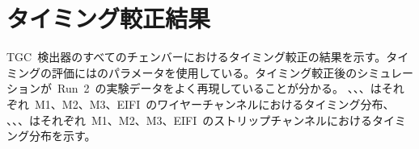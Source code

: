 \renewcommand{\prechaptername}{付録}
\renewcommand{\postchaptername}{}
\renewcommand{\thechapter}{\Alph{chapter}}
\setcounter{chapter}{0}

\chapter{タイミング較正結果}
\thispagestyle{empty}
\label{app:app1}
TGC~検出器のすべてのチェンバーにおけるタイミング較正の結果を示す。タイミングの評価にはのパラメータを使用している。タイミング較正後のシミュレーションが~Run~2~の実験データをよく再現していることが分かる。
、、、はそれぞれ~M1、M2、M3、EIFI~のワイヤーチャンネルにおけるタイミング分布、
、、、はそれぞれ~M1、M2、M3、EIFI~のストリップチャンネルにおけるタイミング分布を示す。

